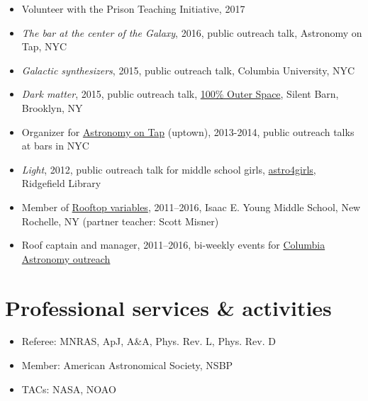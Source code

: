 \documentclass[12pt, letterpaper]{apw-cv}
\begin{document}
\begin{itemize}
    \item Volunteer with the Prison Teaching Initiative, 2017
    \item \emph{The bar at the center of the Galaxy}, 2016, public outreach talk, Astronomy on Tap, NYC
    \item \emph{Galactic synthesizers}, 2015, public outreach talk, Columbia University, NYC
    \item \emph{Dark matter}, 2015, public outreach talk, \href{http://silentbarn.org/2015/03/100-outer-space-party}{100\% Outer Space}, Silent Barn, Brooklyn, NY
    \item Organizer for \href{http://astronomyontap.org/}{Astronomy on Tap} (uptown), 2013-2014, public outreach talks at bars in NYC
    \item \emph{Light}, 2012, public outreach talk for middle school girls, \href{http://www.newstimes.com/news/article/Astronomer-Shoot-for-the-stars-3380793.php}{astro4girls}, Ridgefield Library
    \item Member of \href{http://rv.astro.columbia.edu}{Rooftop variables}, 2011--2016, Isaac E. Young Middle School, New Rochelle, NY (partner teacher: Scott Misner)
    \item Roof captain and manager, 2011--2016, bi-weekly events for \href{http://outreach.astro.columbia.edu/}{Columbia Astronomy outreach}
\end{itemize}

\section*{Professional services \& activities}

\begin{itemize}
	\item Referee: MNRAS, ApJ, A\&A, Phys. Rev. L, Phys. Rev. D
	\item Member: American Astronomical Society, NSBP
    \item TACs: NASA, NOAO
\end{itemize}
\end{document}
